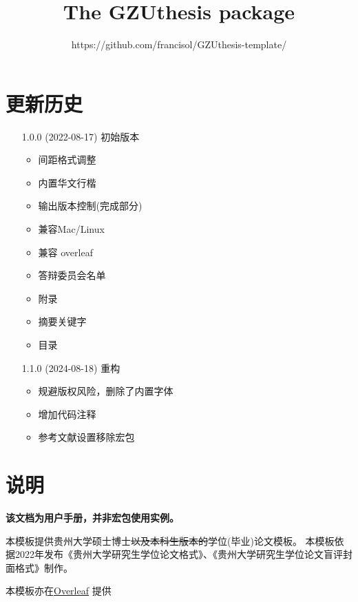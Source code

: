 \documentclass{ctxdoc}
\begin{document}
    \title{The \textsf{GZUthesis} package}
    \author{https://github.com/francisol/GZUthesis-template/}
    \maketitle

    \section*{更新历史}

    \begin{itemize}
        \item[1.0.0] (2022-08-17) 初始版本
        \begin{itemize}
            \item 间距格式调整
            \item 内置华文行楷
            \item 输出版本控制(完成部分)
            \item 兼容Mac/Linux
            \item 兼容 overleaf
            \item 答辩委员会名单
            \item 附录
            \item 摘要关键字
            \item 目录
        \end{itemize}

        \item[1.1.0] (2024-08-18) 重构
        \begin{itemize}
            \item 规避版权风险，删除了内置字体
            \item 增加代码注释
            \item 参考文献设置移除宏包
        \end{itemize}
    \end{itemize}


    \section{说明}
    \textbf{该文档为用户手册，并非宏包使用实例。}


    本模板提供贵州大学硕士博士\sout{以及本科生版本的}学位(毕业)论文模板。
    本模板依据2022年发布《贵州大学研究生学位论文格式》、《贵州大学研究生学位论文盲评封面格式》制作。

    本模板亦在\href{https://www.overleaf.com/latex/templates/gui-zhou-da-xue-yan-jiu-sheng-bi-ye-lun-wen-mo-ban/tstnysppbxvh}{Overleaf} 提供
\end{document}
